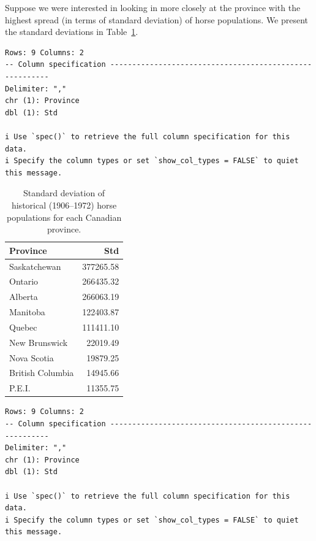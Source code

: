 \documentclass[
  letterpaper,
  DIV=11,
  numbers=noendperiod]{scrartcl}
\begin{document}
Suppose we were interested in looking in more closely at the province
with the highest spread (in terms of standard deviation) of horse
populations. We present the standard deviations in
Table~\ref{tbl-horse-sd}.

\begin{verbatim}
Rows: 9 Columns: 2
-- Column specification --------------------------------------------------------
Delimiter: ","
chr (1): Province
dbl (1): Std

i Use `spec()` to retrieve the full column specification for this data.
i Specify the column types or set `show_col_types = FALSE` to quiet this message.
\end{verbatim}

\begin{longtable}[]{@{}lr@{}}

\caption{\label{tbl-horse-sd}Standard deviation of historical
(1906--1972) horse populations for each Canadian province.}

\tabularnewline

\toprule\noalign{}
Province & Std \\
\midrule\noalign{}
\endhead
\bottomrule\noalign{}
\endlastfoot
Saskatchewan & 377265.58 \\
Ontario & 266435.32 \\
Alberta & 266063.19 \\
Manitoba & 122403.87 \\
Quebec & 111411.10 \\
New Brunswick & 22019.49 \\
Nova Scotia & 19879.25 \\
British Columbia & 14945.66 \\
P.E.I. & 11355.75 \\

\end{longtable}

\begin{verbatim}
Rows: 9 Columns: 2
-- Column specification --------------------------------------------------------
Delimiter: ","
chr (1): Province
dbl (1): Std

i Use `spec()` to retrieve the full column specification for this data.
i Specify the column types or set `show_col_types = FALSE` to quiet this message.
\end{verbatim}
\end{document}
